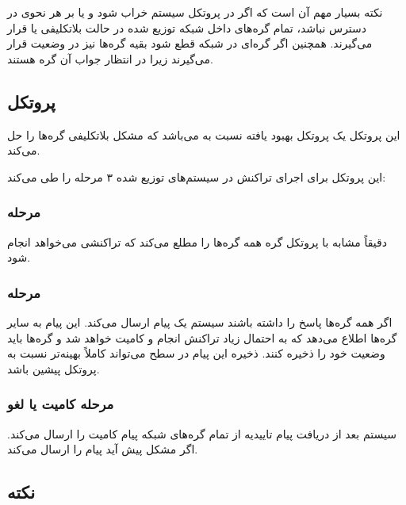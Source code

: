 \documentclass[a4paper]{article}
\begin{document}
نکته بسیار مهم آن است که اگر در پروتکل  سیستم
 خراب شود و یا بر هر نحوی در دسترس نباشد، تمام گره‌های داخل شبکه
توزیع شده در حالت بلاتکلیفی یا  قرار می‌گیرند. همچنین اگر گره‌ای در
شبکه قطع شود بقیه گره‌ها نیز در وضعیت  قرار می‌گیرند زیرا در انتظار
جواب آن گره هستند.

\subsection{پروتکل }

این پروتکل یک پروتکل بهبود یافته نسبت به  می‌باشد که مشکل بلاتکلیفی
گره‌ها را حل می‌کند.

این پروتکل برای اجرای تراکنش در سیستم‌های توزیع شده ۳ مرحله را طی می‌کند:

\subsubsection{مرحله }

دقیقاً مشابه با پروتکل  گره  همه گره‌ها را مطلع می‌کند
که تراکنشی می‌خواهد انجام شود.

\subsubsection{مرحله }

اگر همه گره‌ها پاسخ  را داشته باشند سیستم  یک پیام
 ارسال می‌کند. این پیام به سایر گره‌ها اطلاع می‌دهد که به احتمال
زیاد تراکنش انجام و کامیت خواهد شد و گره‌ها باید وضعیت خود را ذخیره کنند. ذخیره
این پیام در سطح  می‌تواند کاملاً بهینه‌تر نسبت به پروتکل پیشین
باشد.

\subsubsection{مرحله کامیت یا لغو }

سیستم  بعد از دریافت پیام تاییدیه  از تمام
گره‌های شبکه پیام کامیت را ارسال می‌کند. اگر مشکل پیش آید پیام  را
ارسال می‌کند.

\subsection{نکته}
\end{document}
